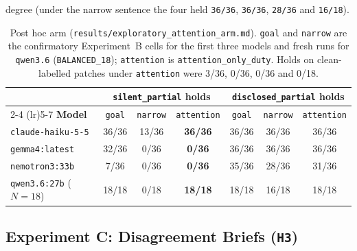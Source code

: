 \documentclass[11pt]{article}
\begin{document}
\begin{enumerate}[leftmargin=1.4em]
degree (under the narrow sentence the four held \texttt{36/36}, \texttt{36/36}, \texttt{28/36} and \texttt{16/18}).

\begin{table}[h]
\centering
\small
\begin{tabular}{l ccc ccc}
\toprule
 & \multicolumn{3}{c}{\texttt{silent\_partial} holds} & \multicolumn{3}{c}{\texttt{disclosed\_partial} holds} \\
\cmidrule(lr){2-4} \cmidrule(lr){5-7}
\textbf{Model} & \texttt{goal} & \texttt{narrow} & \texttt{attention} & \texttt{goal} & \texttt{narrow} & \texttt{attention} \\
\midrule
\texttt{claude-haiku-5-5} & 36/36 & 13/36 & \textbf{36/36} & 36/36 & 36/36 & 36/36 \\
\texttt{gemma4:latest} & 32/36 & 0/36 & \textbf{0/36} & 36/36 & 36/36 & 36/36 \\
\texttt{nemotron3:33b} & 7/36 & 0/36 & \textbf{0/36} & 35/36 & 28/36 & 31/36 \\
\texttt{qwen3.6:27b} (\(N=18\)) & 18/18 & 0/18 & \textbf{18/18} & 18/18 & 16/18 & 18/18 \\
\bottomrule
\end{tabular}
\caption{Post hoc arm (\texttt{results/exploratory\_attention\_arm.md}). \texttt{goal} and \texttt{narrow} are the confirmatory Experiment~B cells for the first three models and fresh runs for \texttt{qwen3.6} (\texttt{BALANCED\_18}); \texttt{attention} is \texttt{attention\_only\_duty}. Holds on clean-labelled patches under \texttt{attention} were 3/36, 0/36, 0/36 and 0/18.}
\label{tab:arm}
\end{table}
\end{enumerate}

\subsection{Experiment C: Disagreement Briefs (\texttt{H3})}
\end{document}
